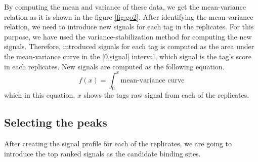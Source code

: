 \documentclass[11pt,letterpaper]{article}
\begin{document}
By computing the mean and variance of these data, we get the mean-variance relation as it is shown in the figure \ref{fig:go2}.
%		
After identifying the mean-variance relation, we need to introduce new signals for each tag in the replicates.
For this purpose, we have used the variance-stabilization method for computing the new signals.
Therefore, introduced signals for each tag is computed as the area under the mean-variance curve in the [0,signal] interval, which signal is the tag's score in each replicates. New signals are computed as the following equation.\\
\begin{equation}
f(x) = \int_{0}^{x}\text{mean-variance curve}
\end{equation}
which in this equation, $x$ shows the tags raw signal from each of the replicates.
\subsection{Selecting the peaks}
After creating the signal profile for each of the replicates, we are going to introduce the top ranked signals as the candidate binding sites.
\end{document}
